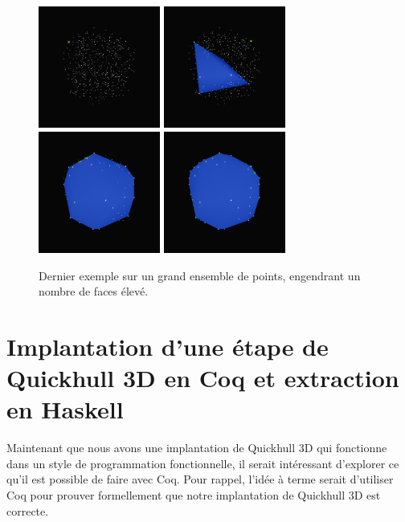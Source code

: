 \documentclass[]{article}
\begin{document}
\begin{figure}[H]
	\includegraphics[width=4cm]{qh3d/demo3d/main_0.png}
	\includegraphics[width=4cm]{qh3d/demo3d/main_1.png}
	\includegraphics[width=4cm]{qh3d/demo3d/main_2.png}
	\includegraphics[width=4cm]{qh3d/demo3d/main_3.png}
	\caption{Dernier exemple sur un grand ensemble de points, engendrant un nombre de faces élevé.}
\end{figure}

\section{Implantation d'une étape de Quickhull 3D en Coq et extraction en Haskell}
Maintenant que nous avons une implantation de Quickhull 3D qui fonctionne dans un style de programmation fonctionnelle, il serait intéressant d'explorer ce qu'il est possible de faire avec Coq. Pour rappel, l'idée à terme serait d'utiliser Coq pour prouver formellement que notre implantation de Quickhull 3D est correcte.
\end{document}

